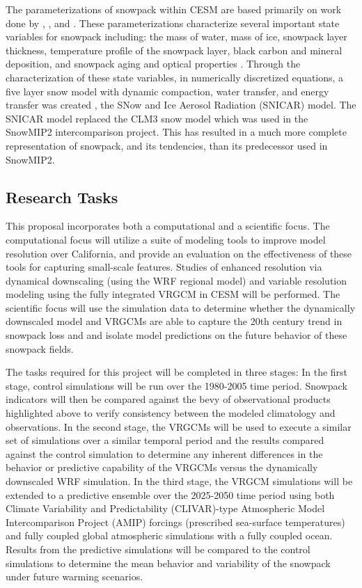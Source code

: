 \documentclass[11pt]{article}
\begin{document}
The parameterizations of snowpack within CESM are based primarily on work done by \citet{anderson1976point}, \citet{jordan1991one}, and \citet{yongjiu1997land}. These parameterizations characterize several important state variables for snowpack including: the mass of water, mass of ice, snowpack layer thickness, temperature profile of the snowpack layer, black carbon and mineral deposition, and snowpack aging and optical properties \citep{lawrence2011parameterization}. Through the characterization of these state variables, in numerically discretized equations, a five layer snow model with dynamic compaction, water transfer, and energy transfer was created \citep{lawrence2011parameterization}, the SNow and Ice Aerosol Radiation (SNICAR) model.  The SNICAR model replaced the CLM3 snow model which was used in the SnowMIP2 intercomparison project.  This has resulted in a much more complete representation of snowpack, and its tendencies, than its predecessor used in SnowMIP2.

\subsection{Research Tasks}
This proposal incorporates both a computational and a scientific focus. The computational focus will utilize a suite of modeling tools to improve model resolution over California, and provide an evaluation on the effectiveness of these tools for capturing small-scale features. Studies of enhanced resolution via dynamical downscaling (using the WRF regional model) and variable resolution modeling using the fully integrated VRGCM in CESM will be performed. The scientific focus will use the simulation data to determine whether the dynamically downscaled model and VRGCMs are able to capture the 20th century trend in snowpack loss and and isolate model predictions on the future behavior of these snowpack fields.

The tasks required for this project will be completed in three stages: In the first stage, control simulations will be run over the 1980-2005 time period. Snowpack indicators will then be compared against the bevy of observational products highlighted above to verify consistency between the modeled climatology and observations. In the second stage, the VRGCMs will be used to execute a similar set of simulations over a similar temporal period and the results compared against the control simulation to determine any inherent differences in the behavior or predictive capability of the VRGCMs versus the dynamically downscaled WRF simulation. In the third stage, the VRGCM simulations will be extended to a predictive ensemble over the 2025-2050 time period using both Climate Variability and Predictability (CLIVAR)-type Atmospheric Model Intercomparison Project (AMIP) forcings (prescribed sea-surface temperatures) and fully coupled global atmospheric simulations with a fully coupled ocean. Results from the predictive simulations will be compared to the control simulations to determine the mean behavior and variability of the snowpack under future warming scenarios.
\end{document}
